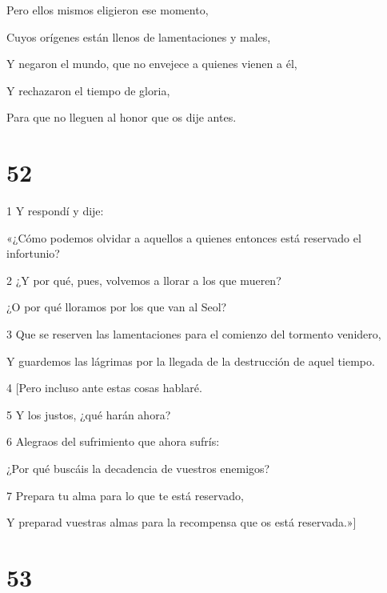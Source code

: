 \par Pero ellos mismos eligieron ese momento,

\par Cuyos orígenes están llenos de lamentaciones y males,

\par Y negaron el mundo, que no envejece a quienes vienen a él,

\par Y rechazaron el tiempo de gloria,

\par Para que no lleguen al honor que os dije antes.

\chapter{52}

\par 1 Y respondí y dije:

\par «¿Cómo podemos olvidar a aquellos a quienes entonces está reservado el infortunio?

\par 2 ¿Y por qué, pues, volvemos a llorar a los que mueren?

\par ¿O por qué lloramos por los que van al Seol?

\par 3 Que se reserven las lamentaciones para el comienzo del tormento venidero,

\par Y guardemos las lágrimas por la llegada de la destrucción de aquel tiempo.

\par 4 [Pero incluso ante estas cosas hablaré.

\par 5 Y los justos, ¿qué harán ahora?

\par 6 Alegraos del sufrimiento que ahora sufrís:

\par ¿Por qué buscáis la decadencia de vuestros enemigos?

\par 7 Prepara tu alma para lo que te está reservado,

\par Y preparad vuestras almas para la recompensa que os está reservada.»]

\chapter{53}

